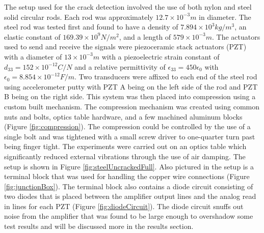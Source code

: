 The setup used for the crack detection involved the use of both nylon and steel solid circular rods. Each rod was approximately $12.7 \times 10^{-3} m$ in diameter. The steel rod was tested first and found to have a density of $7.894 \times 10^3 kg/m^3$, an elastic constant of $169.39 \times 10^9 N/m^2$, and a length of $579 \times 10^{-3} m$. The actuators used to send and receive the signals were piezoceramic stack actuators (PZT) with a diameter of $13 \times 10^{-3} m$ with a piezoelectric strain constant of $d_{33} = 152 \times 10^{-12} C/N$ and a relative permittivity of $\epsilon _{33} = 450 \epsilon _0$ with $\epsilon _0 = 8.854 \times 10 ^{-12} F/m$. Two transducers were affixed to each end of the steel rod using accelerometer putty with PZT A being on the left side of the rod and PZT B being on the right side. This system was then placed into compression using a custom built mechanism. The compression mechanism was created using common nuts and bolts, optics table hardware, and a few machined aluminum blocks (Figure \ref{fig:compression}). The compression could be controlled by the use of a single bolt and was tightened with a small screw driver to one-quarter turn past being finger tight. The experiments were carried out on an optics table which significantly reduced external vibrations through the use of air damping. The setup is shown in Figure \ref{fig:steelUncrackedFull}. Also pictured in the setup is a terminal block that was used for handling the copper wire connections (Figure \ref{fig:junctionBox}). The terminal block also contains a diode circuit consisting of two diodes that is placed between the amplifier output lines and the analog read in lines for each PZT (Figure \ref{fig:diodeCircuit}). The diode circuit snuffs out noise from the amplifier that was found to be large enough to overshadow some test results and will be discussed more in the results section.

